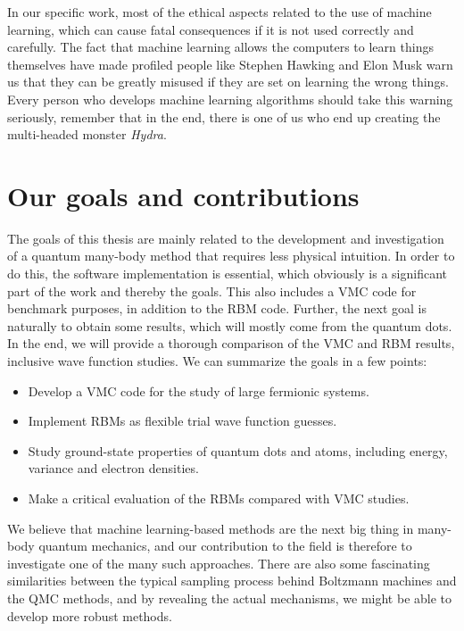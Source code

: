 In our specific work, most of the ethical aspects related to the use of machine learning, which can cause fatal consequences if it is not used correctly and carefully. The fact that machine learning allows the computers to learn things themselves have made profiled people like Stephen Hawking \cite{cellan-jones_hawking:_2014} and Elon Musk \cite{vance_elon_2015} warn us that they can be greatly misused if they are set on learning the wrong things. Every person who develops machine learning algorithms should take this warning seriously, remember that in the end, there is one of us who end up creating the multi-headed monster \textit{Hydra}.

\section{Our goals and contributions} \label{sec:goals}
The goals of this thesis are mainly related to the development and investigation of a quantum many-body method that requires less physical intuition. In order to do this, the software implementation is essential, which obviously is a significant part of the work and thereby the goals. This also includes a VMC code for benchmark purposes, in addition to the RBM code. Further, the next goal is naturally to obtain some results, which will mostly come from the quantum dots. In the end, we will provide a thorough comparison of the VMC and RBM results, inclusive wave function studies. We can summarize the goals in a few points:
\begin{itemize}
	\item Develop a VMC code for the study of large fermionic systems.
	\item Implement RBMs as flexible trial wave function guesses.
	\item Study ground-state properties of quantum dots and atoms, including energy, variance and electron densities.
	\item Make a critical evaluation of the RBMs compared with VMC studies.
\end{itemize}

We believe that machine learning-based methods are the next big thing in many-body quantum mechanics, and our contribution to the field is therefore to investigate one of the many such approaches. There are also some fascinating similarities between the typical sampling process behind Boltzmann machines and the QMC methods, and by revealing the actual mechanisms, we might be able to develop more robust methods. 

